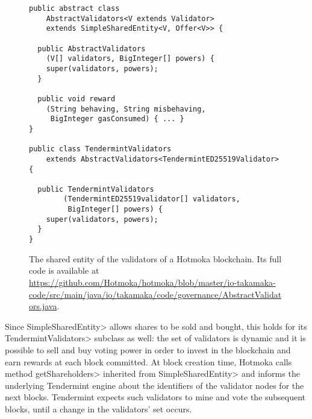 \begin{figure}[t]
  \begin{center}
    \begin{lstlisting}[language=Takamaka]
public abstract class 
    AbstractValidators<V extends Validator>
    extends SimpleSharedEntity<V, Offer<V>> {

  public AbstractValidators
    (V[] validators, BigInteger[] powers) {
    super(validators, powers);
  }

  public void reward
    (String behaving, String misbehaving, 
     BigInteger gasConsumed) { ... }
}

public class TendermintValidators
    extends AbstractValidators<TendermintED25519Validator> {

  public TendermintValidators
        (TendermintED25519validator[] validators, 
         BigInteger[] powers) {
    super(validators, powers);
  }
}
    \end{lstlisting}
  \end{center}
  \caption{The shared entity of the validators of a Hotmoka blockchain.
  Its full code is available at \textsf{\url{https://github.com/Hotmoka/hotmoka/blob/master/io-takamaka-code/src/main/java/io/takamaka/code/governance/AbstractValidators.java}}.}\label{fig:abstract_validators}
\end{figure}

Since \<SimpleSharedEntity> allows shares to be sold and bought, this holds for
its \<TendermintValidators> subclass as well: the set of validators
is dynamic and it is possible to sell and buy voting power in order to invest in the blockchain
and earn rewards at each block committed. At block creation time,
Hotmoka calls method \<getShareholders> inherited from
\<SimpleSharedEntity> and informs the
underlying Tendermint engine about the identifiers of the validator nodes for the next blocks.
Tendermint expects such validators to mine and vote the subsequent blocks, until a change in the
validators' set occurs.

